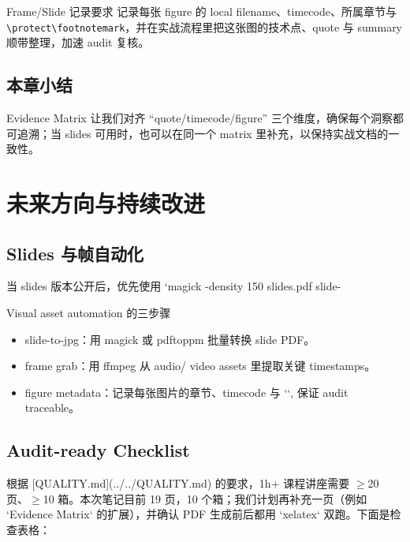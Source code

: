 \documentclass[a4paper]{article}
\begin{document}
\begin{importantbox}{Frame/Slide 记录要求}
记录每张 figure 的 local filename、timecode、所属章节与 \verb|\protect\footnotemark|，并在实战流程里把这张图的技术点、quote 与 summary 顺带整理，加速 audit 复核。
\end{importantbox}

\subsection{本章小结}
Evidence Matrix 让我们对齐 ``quote/timecode/figure'' 三个维度，确保每个洞察都可追溯；当 slides 可用时，也可以在同一个 matrix 里补充，以保持实战文档的一致性。

\section{未来方向与持续改进}

\subsection{Slides 与帧自动化}
当 slides 版本公开后，优先使用 `magick -density 150 slides.pdf slide-%

\begin{knowledgebox}{Visual asset automation 的三步骤}
\begin{itemize}
    \item slide-to-jpg：用 magick 或 pdftoppm 批量转换 slide PDF。
    \item frame grab：用 ffmpeg 从 audio/ video assets 里提取关键 timestamps。
    \item figure metadata：记录每张图片的章节、timecode 与 `\protect\footnotemark`, 保证 audit traceable。
\end{itemize}
\end{knowledgebox}

\subsection{Audit-ready Checklist}
根据 [QUALITY.md](../../QUALITY.md) 的要求，1h+ 课程讲座需要 $\geq$20 页、$\geq$10 箱。本次笔记目前 19 页，10 个箱；我们计划再补充一页（例如 `Evidence Matrix` 的扩展），并确认 PDF 生成前后都用 `xelatex` 双跑。下面是检查表格：
\end{document}
